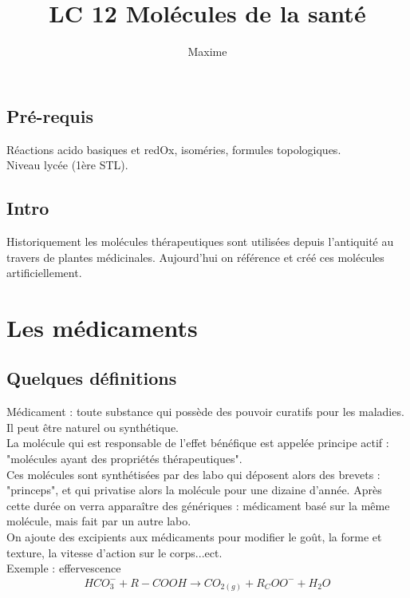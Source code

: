 \documentclass[12pt,prb,aps,epsf]{article}
\begin{document}
	
	\title{LC 12 Molécules de la santé}
	\author{Maxime}
	
	\maketitle
	
	\tableofcontents
	
	\pagebreak
	
\subsection{Pré-requis}
Réactions acido basiques et redOx, isoméries, formules topologiques.\\
Niveau lycée (1ère STL).

\subsection{Intro}
Historiquement les molécules thérapeutiques sont utilisées depuis l'antiquité au travers de plantes médicinales. Aujourd'hui on référence et créé ces molécules artificiellement.

\section{Les médicaments}
\subsection{Quelques définitions}
Médicament : toute substance qui possède des pouvoir curatifs pour les maladies. Il peut être naturel ou synthétique.\\
La molécule qui est responsable de l'effet bénéfique est appelée principe actif : "molécules ayant des propriétés thérapeutiques".\\
Ces molécules sont synthétisées par des labo qui déposent alors des brevets : "princeps", et qui privatise alors la molécule pour une dizaine d'année. Après cette durée on verra apparaître des génériques : médicament basé sur la même molécule, mais fait par un autre labo.\\

On ajoute des excipients aux médicaments pour modifier le goût, la forme et texture, la vitesse d'action sur le corps...ect.\\
Exemple : effervescence
\begin{eqnarray}
HCO_3^- + R-COOH \rightarrow CO_{2(g)} + R_COO^- + H_2O
\end{eqnarray}
\end{document}
